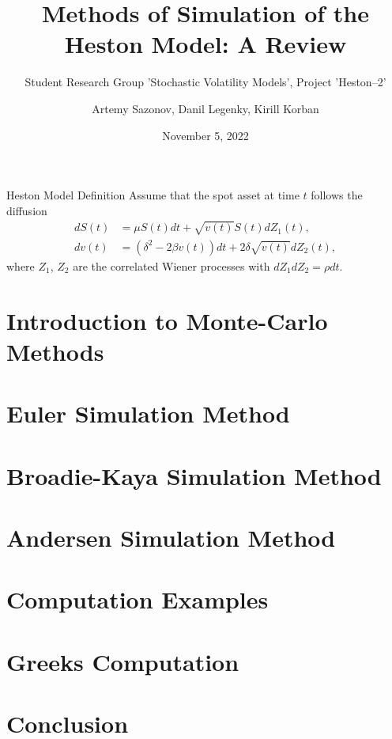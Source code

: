 \documentclass{vegapresentation}
\subtitle{Student Research Group 'Stochastic Volatility Models', Project 'Heston--2'}
\title{Methods of Simulation of the Heston Model: A Review}
\author{Artemy Sazonov, Danil Legenky, Kirill Korban}
\institute{Lomonosov Moscow State Univesity, Faculty of Mechanics and Mathematics}
\date{November 5, 2022}
\begin{document}
    \maketitle

    \begin{frame}{Heston Model Definition}
        Assume that the spot asset at time $t$ follows the diffusion
        \begin{align}
            dS(t) & = \mu S(t)dt + \sqrt{v(t)} S(t) dZ_1(t), \label{Heston:price}\\
            dv(t) & = \left(\delta^2 - 2\beta v(t)\right) dt + 2\delta \sqrt{v(t)} dZ_2(t), \label{Heston:variance}
        \end{align}
        where $Z_1$, $Z_2$ are the correlated Wiener processes with $dZ_1dZ_2 = \rho dt$.
    \end{frame}

    
    \section{Introduction to Monte-Carlo Methods}
        

    \section{Euler Simulation Method}
        

    \section{Broadie-Kaya Simulation Method} 
        

    \section{Andersen Simulation Method}
        

    \section{Computation Examples}
        

    \section{Greeks Computation}
        
    
    \section*{Conclusion}
\end{document}
